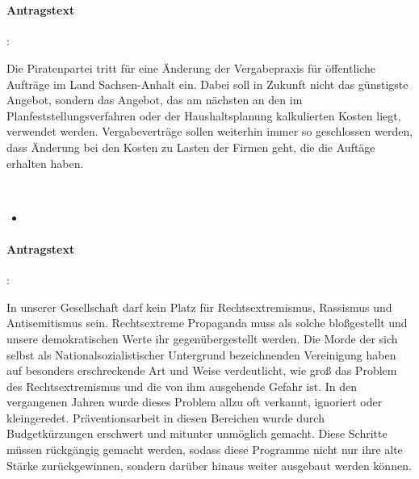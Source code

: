 
\\

\paragraph{Antragstext}:

Die Piratenpartei tritt für eine Änderung der Vergabepraxis für öffentliche Aufträge im Land Sachsen-Anhalt ein. Dabei soll in Zukunft nicht das günstigste Angebot, sondern das Angebot, das am nächsten an den im Planfeststellungsverfahren oder der Haushaltsplanung kalkulierten Kosten liegt, verwendet werden. Vergabeverträge sollen weiterhin immer so geschlossen werden, dass Änderung bei den Kosten zu Lasten der Firmen geht, die die Auftäge erhalten haben.



\label{sa:rechtsex1}
\\
\begin{itemize}
\item {}
\end{itemize}

\paragraph{Antragstext}:

In unserer Gesellschaft darf kein Platz für Rechtsextremismus, Rassismus und Antisemitismus sein. Rechtsextreme Propaganda muss als solche bloßgestellt und unsere demokratischen Werte ihr gegenübergestellt werden. Die Morde der sich selbst als {\Gu}Nationalsozialistischer Untergrund{\Go} bezeichnenden Vereinigung haben auf besonders erschreckende Art und Weise verdeutlicht, wie groß das Problem des Rechtsextremismus und die von ihm ausgehende Gefahr ist. In den vergangenen Jahren wurde dieses Problem allzu oft verkannt, ignoriert oder kleingeredet. Präventionsarbeit in diesen Bereichen wurde durch Budgetkürzungen erschwert und mitunter unmöglich gemacht. Diese Schritte müssen rückgängig gemacht werden, sodass diese Programme nicht nur ihre alte Stärke zurückgewinnen, sondern darüber hinaus weiter ausgebaut werden können.

